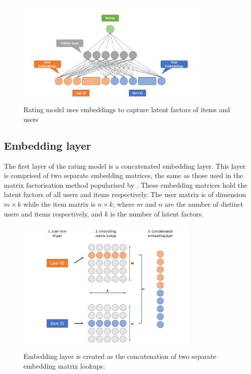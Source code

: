 \begin{figure}[H]
\centering
\includegraphics[width=0.85\textwidth]{Figures/4_rating-model.pdf}
\decoRule
\caption[Rating model]{Rating model uses embeddings to capture latent factors of items and users}
\label{fig:4_rating-prediction-architecture}
\end{figure}

\subsection{Embedding layer}
The first layer of the rating model is a concatenated embedding layer. This layer is comprised of two separate embedding matrices, the same as those used in the matrix factorisation method popularised by \citeauthor{koren2009matrix}. These embedding matrices hold the latent factors of all users and items respectively. The user matrix is of dimension $m\times k$ while the item matrix is $n\times k$, where $m$ and $n$ are the number of distinct users and items respectively, and $k$ is the number of latent factors.

\begin{figure}[H]
\centering
\includegraphics[width=0.8\textwidth]{Figures/4_CGT-embedding-layer.pdf}
\decoRule
\caption[Embedding layer]{Embedding layer is created as the concatenation of two separate embedding matrix lookups.}
\label{fig:4_CGT-embedding-layer}
\end{figure}

